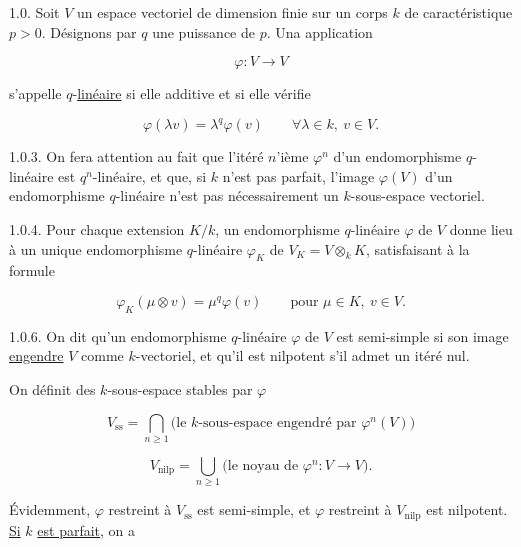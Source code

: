 1.0. Soit $V$ un espace vectoriel de dimension finie sur un corps $k$ de
caractéristique $p>0$. Désignons par $q$ une puissance de $p$. Una application

\begin{equation}\tag{1.0.1}
\varphi:V\longrightarrow V
\end{equation}

s'appelle $q$-\underline{linéaire} si elle additive et si elle vérifie

\begin{equation}\tag{1.0.2}
\varphi(\lambda v)=\lambda^q\varphi(v)
\qquad \forall\lambda\in k,\ v\in V.
\end{equation}

1.0.3. On fera attention au fait que l'itéré $n$'ième $\varphi^n$ d'un
endomorphisme $q$-linéaire est $q^n$-linéaire, et que, si $k$ n'est pas
parfait, l'image $\varphi(V)$ d'un endomorphisme $q$-linéaire n'est pas
nécessairement un $k$-sous-espace vectoriel.

1.0.4. Pour chaque extension $K/k$, un endomorphisme $q$-linéaire $\varphi$
de $V$ donne lieu à un unique endomorphisme $q$-linéaire $\varphi_K$ de
$V_K=V\otimes_k K$, satisfaisant à la formule

\begin{equation}\tag{1.0.5}
\varphi_K(\mu\otimes v)=\mu^q\varphi(v)
\qquad\text{pour }\mu\in K,\ v\in V.
\end{equation}


1.0.6. On dit qu'un endomorphisme $q$-linéaire $\varphi$ de $V$ est
semi-simple si son image \underline{engendre} $V$ comme $k$-vectoriel, et
qu'il est nilpotent s'il admet un itéré nul.

On définit des $k$-sous-espace stables par $\varphi$

\begin{equation}\tag{1.0.7}
V_{\mathrm{ss}}=
\bigcap_{n\geq1}
\bigl(\text{le $k$-sous-espace engendré par }\varphi^n(V)\bigr)
\end{equation}

\begin{equation}\tag{1.0.8}
V_{\mathrm{nilp}}=
\bigcup_{n\geq1}\bigl(\text{le noyau de }\varphi^n:V\longrightarrow V\bigr).
\end{equation}

Évidemment, $\varphi$ restreint à $V_{\mathrm{ss}}$ est semi-simple, et
$\varphi$ restreint à $V_{\mathrm{nilp}}$ est nilpotent. \underline{Si} $k$ \underline{est parfait},
on a

